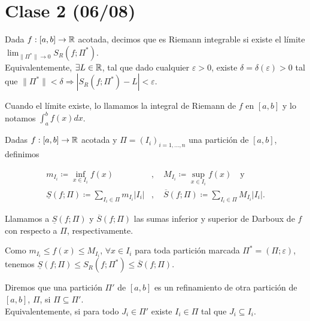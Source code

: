 
	\section{Clase 2 (06/08)}

	\begin{definition}
		Dada $f:[a,b]\to\mathbb{R}$ acotada, decimos que es Riemann integrable si existe el límite $\lim_{\|\Pi^*\|\to 0} S_R(f;\Pi^*)$. \\
		Equivalentemente, $\exists L\in\mathbb{R}$, tal que dado cualquier $\varepsilon>0$, existe $\delta=\delta(\varepsilon)>0$ tal que $\|\Pi^*\|<\delta\Rightarrow|S_R(f;\Pi^*)-L|<\varepsilon$.
	\end{definition}

	\begin{remark}
		Cuando el límite existe, lo llamamos la integral de Riemann de $f$ en $[a,b]$ y lo notamos $\int_{a}^{b} f(x) dx$.
	\end{remark}

	\begin{definition}
		Dadas $f:[a,b]\to\mathbb{R}$ acotada y $\Pi=(I_i)_{i=1,\dots,n}$ una partición de $[a,b]$, definimos 
	
		\begin{align*}
			m_{I_i}\coloneqq\inf_{x\in I_i} f(x) &,\quad M_{I_i}\coloneqq\sup_{x\in I_i} f(x) \quad \text{y} \\
			\underline{S}(f;\Pi)\coloneqq\sum_{I_i\in\Pi}^{} m_{I_i}|I_i|&,\quad \overline{S}(f;\Pi)\coloneqq\sum_{I_i\in\Pi}^{} M_{I_i}|I_i|
		.\end{align*}

		Llamamos a $\underline{S}(f;\Pi)$ y $\overline{S}(f;\Pi)$ las sumas inferior y superior de Darboux de $f$ con respecto a $\Pi$, respectivamente.
	\end{definition}

	\begin{note}
		Como $m_{I_i}\leq f(x)\leq M_{I_i}$, $\forall x\in I_i$ para toda partición marcada $\Pi^*=(\Pi;\varepsilon)$, tenemos $\underline{S}(f;\Pi)\leq S_R(f;\Pi^*)\leq \overline{S}(f;\Pi)$.
	\end{note}

	\begin{definition}[refinamiento]
		Diremos que una partición $\Pi'$ de $[a,b]$ es un refinamiento de otra partición de $[a,b]$, $\Pi$, si $\Pi\subseteq\Pi'$. \\
		Equivalentemente, si para todo $J_i\in\Pi'$ existe $I_i\in\Pi$ tal que $J_i\subseteq I_i$.
	\end{definition}

